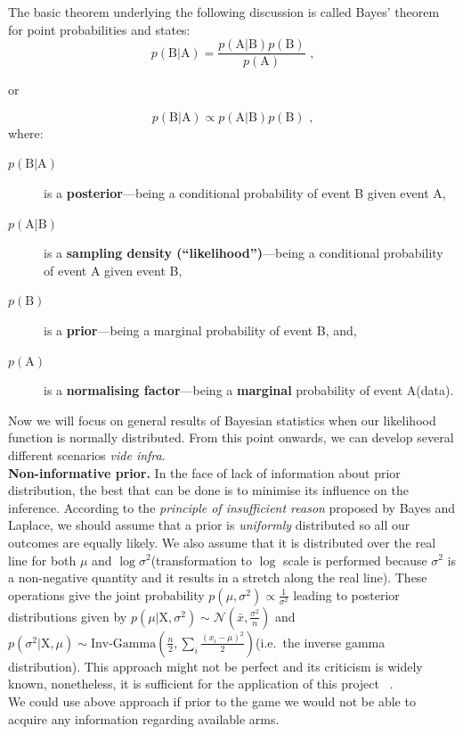\documentclass[12pt, a4paper, pdflatex, leqno, twoside]{report}
\begin{document}
The basic theorem underlying the following discussion is called Bayes' theorem for point probabilities and states:
$$
p \left( \mathrm{B} | \mathrm{A} \right) = \frac{  p \left( \mathrm{A} | 
\mathrm{B} \right) p \left( \mathrm{B} \right) }{ p \left( \mathrm{A} \right) }  \text{ ,}
$$
\begin{center}
or
\end{center}
$$
p \left( \mathrm{B} | \mathrm{A} \right) \propto p \left( \mathrm{A} | 
\mathrm{B} \right) p \left( \mathrm{B} \right) \text{ ,}
$$
where:
\begin{description}
\item[$p \left( \mathrm{B} | \mathrm{A} \right)$] is a \textbf{posterior}---being a
conditional probability of event \textrm{B} given event \textrm{A},
\item[$p \left( \mathrm{A} | \mathrm{B} \right)$] is a \textbf{sampling density 
(``likelihood'')}---being a conditional probability of event \textrm{A} given 
event \textrm{B},
\item[$p \left( \mathrm{B} \right)$] is a \textbf{prior}---being a marginal 
probability of event \textrm{B}, and,
\item[$p \left( \mathrm{A} \right)$] is a \textbf{normalising factor}---being a \textbf{marginal} probability of event 
\textrm{A}(data).
\end{description}

Now we will focus on general results of Bayesian statistics when our likelihood 
function is normally distributed. From this point onwards, we can develop several different scenarios \emph{vide infra}.\\[1.5cm]

\textbf{\textrm{Non-informative prior. }}In the face of lack of information about 
prior distribution, the best that can be done is to minimise its influence on 
the inference. According to the \emph{principle of insufficient reason} proposed by 
Bayes and Laplace, we should assume that a prior is \emph{uniformly} distributed 
so all our outcomes are equally likely. We also assume that it is distributed over 
the real line for both $\mu$ and $\log \sigma^2$(transformation to $\log$ scale 
is performed because $\sigma^2$ is a non-negative quantity and it results in a
stretch along the real line). These operations give the joint probability $p 
\left( \mu, \sigma^2 \right) \propto \frac{1}{\sigma^2} $ leading to posterior 
distributions given by $p \left( \mu | \mathrm{X}, \sigma^2 \right) \sim 
\mathcal{N} \left( \bar{x}, \frac{\sigma^2}{n} \right) $ and $p \left( \sigma^2 
| \mathrm{X}, \mu \right) \sim \mathrm{Inv}\text{-}\mathrm{Gamma} \left( 
\frac{n}{2} , \sum_{i} \frac{\left( x_i - \mu \right)^2}{2}  \right) $(i.e.\ the inverse 
gamma distribution). This approach might not be perfect and its criticism is widely 
known, nonetheless, it is sufficient for the application of this project ~\citep{Syversveen98noninformativebayesian}.\\
We could use above approach if prior to the game we would not be able to acquire any information regarding available arms.\\
\end{document}
